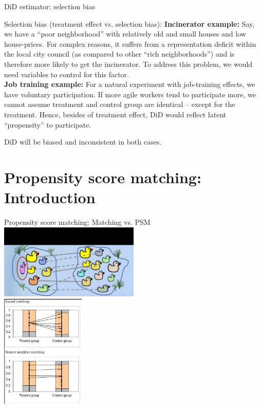 \documentclass{beamer}
\begin{document}
\begin{frame}{DiD estimator: selection bias}
\begin{block}{Selection bias (treatment effect vs. selection bias):}
\small
\textbf{Incinerator example:} Say, we have a “poor neighborhood” with relatively old and small houses and low house-prices. For complex reasons, it suffers from a representation deficit within the local city council (as compared to other “rich neighborhoods”) and is therefore more likely to get the incinerator. To address this problem, we would need variables to control for this factor.\\
\medskip
\textbf{Job training example:} For a natural experiment with job-training effects, we have voluntary participation. If more agile workers tend to participate more, we cannot assume treatment and control group are identical -- except for the treatment. Hence, besides of treatment effect, DiD would reflect latent ``propensity'' to participate.
\end{block}
\medskip 
DiD will be biased and inconsistent in both cases.
\end{frame}
\section{Propensity score matching: Introduction}
\begin{frame}{Propensity score matching: Matching vs. PSM}
\centering
\includegraphics[trim = 0cm 0cm 0cm 6cm, clip, width=0.5\textwidth]{./IMG/PSM1}
\\
\medskip
\includegraphics[trim = 0.1cm 0.15cm 0cm 0.15cm, clip, width=0.3\textwidth]{./IMG/PSM2}
\end{frame}
\end{document}
